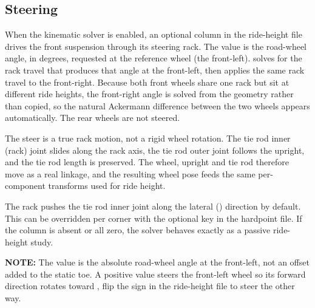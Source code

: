 \subsection{Steering}
When the kinematic solver is enabled, an optional  column in the ride-height file drives the front suspension through its steering rack. The value is the road-wheel angle, in degrees, requested at the reference wheel (the front-left).  solves for the rack travel that produces that angle at the front-left, then applies the same rack travel to the front-right. Because both front wheels share one rack but sit at different ride heights, the front-right angle is solved from the geometry rather than copied, so the natural Ackermann difference between the two wheels appears automatically. The rear wheels are not steered.

The steer is a true rack motion, not a rigid wheel rotation. The tie rod inner (rack) joint slides along the rack axis, the tie rod outer joint follows the upright, and the tie rod length is preserved. The wheel, upright and tie rod therefore move as a real linkage, and the resulting wheel pose feeds the same per-component transforms used for ride height.

The rack pushes the tie rod inner joint along the lateral () direction by default. This can be overridden per corner with the optional  key in the hardpoint file. If the  column is absent or all zero, the solver behaves exactly as a passive ride-height study.

\textbf{NOTE:} The  value is the absolute road-wheel angle at the front-left, not an offset added to the static toe. A positive value steers the front-left wheel so its forward direction rotates toward , flip the sign in the ride-height file to steer the other way.

